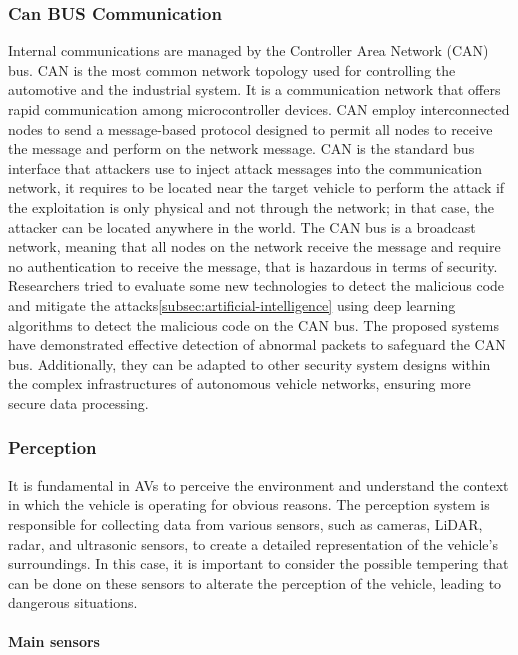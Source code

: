 \subsubsection{Can BUS Communication}\label{subsubsec:canbus-communication}
Internal communications are managed by the Controller Area Network (CAN) bus.
CAN is the most common network topology used for controlling the automotive and the industrial system.
It is a communication network that offers rapid communication among microcontroller
devices.
CAN employ interconnected nodes to send a message-based protocol designed to
permit all nodes to receive the message and perform on the network message\cite{canbus}.
CAN is the standard bus interface that attackers use to inject attack messages into the
communication network, it requires to be located near the target vehicle to perform the attack if the exploitation is only physical and not through the network; in that case, the attacker can be located anywhere in the world.
The CAN bus is a broadcast network, meaning that all nodes on the network receive the message and require no authentication to receive the message, that is hazardous in terms of security.
Researchers tried to evaluate some new technologies to detect the malicious code and mitigate the attacks\cite{aldhyani2022attacks}\ref{subsec:artificial-intelligence} using deep learning algorithms to detect the malicious code on the CAN bus.
The proposed systems have demonstrated effective detection of abnormal packets to safeguard the CAN bus.
Additionally, they can be adapted to other security system designs within the complex infrastructures of autonomous vehicle networks, ensuring more secure data processing.

\subsubsection{Perception}\label{subsubsec:perception}
It is fundamental in AVs to perceive the environment and understand the context in which the vehicle is operating for obvious reasons.
The perception system is responsible for collecting data from various sensors, such as cameras, LiDAR, radar, and ultrasonic sensors, to create a detailed representation of the vehicle's surroundings.
In this case, it is important to consider the possible tempering that can be done on these sensors to alterate the perception of the vehicle, leading to dangerous situations\cite{kim2020cybersecurity, sec-sensors-2023, metro2020analysis, sensors}.

\paragraph{Main sensors}

